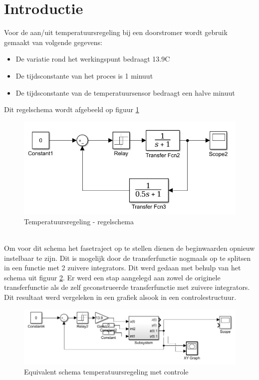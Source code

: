 \documentclass[12pt]{article}
\begin{document}
\section{Introductie}
Voor de aan/uit temperatuursregeling bij een doorstromer wordt gebruik gemaakt van volgende gegevens:
\begin{itemize}
	\item De variatie rond het werkingspunt bedraagt 13.9\degree C
	\item De tijdsconstante van het proces is 1 minuut
	\item De tijdsconstante van de temperatuursensor bedraagt een halve minuut
\end{itemize}
Dit regelschema wordt afgebeeld op figuur \ref{sys2}
\begin{figure}[!h]
	\includegraphics[width=\textwidth ,keepaspectratio]{systeem2.png}
	\centering
	\caption{Temperatuursregeling - regelschema}
	\label{sys2}
\end{figure} \\
Om voor dit schema het fasetraject op te stellen dienen de beginwaarden opnieuw instelbaar te zijn. Dit is mogelijk door de transferfunctie nogmaals op te splitsen in een functie met 2 zuivere integrators. Dit werd gedaan met behulp van het schema uit figuur \ref{schema2}. Er werd een stap aangelegd aan zowel de originele transferfunctie als de zelf geconstrueerde transferfunctie met zuivere integrators. Dit resultaat werd vergeleken in een grafiek alsook in een controlestructuur. 
\begin{figure}[!h]
	\includegraphics[width=\textwidth ,keepaspectratio]{schemasubsystem.png}
	\centering
	\caption{Equivalent schema temperatuursregeling met controle}
	\label{schema2}
\end{figure} 
\end{document}
